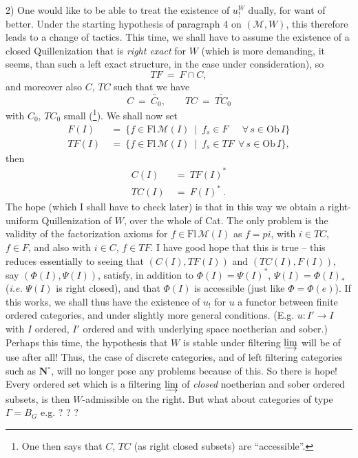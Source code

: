 \documentclass[11pt]{article}
\newcommand{\printedpage}[1]{\marginpar{\footnotesize p.~#1}}
\newcommand{\msp}[1]{\marginpar{\footnotesize [#1]}}
\newcommand{\M}{\mathcal{M}}
\newcommand{\Ob}{\mathrm{Ob}\,}
\newcommand{\Fl}{\mathrm{Fl}\,}
\begin{document}
2) One would like to be able to treat the existence of $u_!^W$ dually, for want of better. Under the starting hypothesis of paragraph 4 on $(\M,W)$, this therefore leads to a change of tactics. This time, we shall have to assume the existence of a closed Quillenization that is \textit{right exact} for $W$ (which is more demanding, it seems, than such a left exact structure, in the case under consideration), so
\[
TF \ = \ F \cap C,
\]
\msp{page 75}
and moreover also $C$, $TC$ such that we have
\[
C \ = \ \widetilde{C_0}, \qquad TC \ = \ \widetilde{TC_0}
\]
with $C_0$, $TC_0$ small (\footnote[38]{One then says that $C$, $TC$ (as right closed subsets) are ``accessible''.}). We shall now set
\[
\begin{aligned}
F(I) \ &= \ \{f \in \Fl \M(I) \ \mid \ f_s \in F \quad\ \ \forall\, s \in \Ob I\}\\
TF(I) \ &= \ \{f \in \Fl \M(I) \ \mid \ f_s \in TF \ \ \forall\, s \in \Ob I\},
\end{aligned}
\]
then
\[
\begin{aligned}
C(I) \ &= \ TF(I)^*\\
TC(I) \ &= \ F(I)^*\ .
\end{aligned}
\]
The hope (which I shall have to check later) is that in this way we obtain a right-uniform Quillenization of $W$, over the whole of Cat. The only problem is the validity of the factorization axioms for $f \in \Fl \M(I)$ as $f = pi$, with $i \in TC$, $f \in F$, and also with $i \in C$, $f \in TF$. %
I have good hope that this is true -- this reduces essentially to seeing that $(C(I),TF(I))$ and $(TC(I),F(I))$, say $(\Phi(I),\Psi(I))$, satisfy, in addition to $\Phi(I) = \Psi(I)^*$, $\Psi(I) = \Phi(I)_*$ (\textit{i.e.} $\Psi(I)$ is right closed), and that $\Phi(I)$ is accessible (just like $\Phi = \Phi(e)$). If this works, we shall thus have the existence
\printedpage{42}
\msp{page 76}
of $u_!$ for $u$ a functor between finite ordered categories, and under slightly more general conditions. (E.g. $u : I' \longrightarrow I$ with $I$ ordered, $I'$ ordered and with underlying space noetherian and sober.) Perhaps this time, the hypothesis that $W$ is stable under filtering $\varinjlim$ will be of use after all! Thus, the case of discrete categories, and of left filtering categories such as $\mathbf{N}^\circ$, will no longer pose any problems because of this. So there is hope! Every ordered set which is a filtering $\varinjlim$ of \textit{closed} noetherian and sober ordered subsets, is then $W$-admissible on the right. But what about categories of type $\Gamma = B_G$ e.g. ? ? ?
\end{document}
